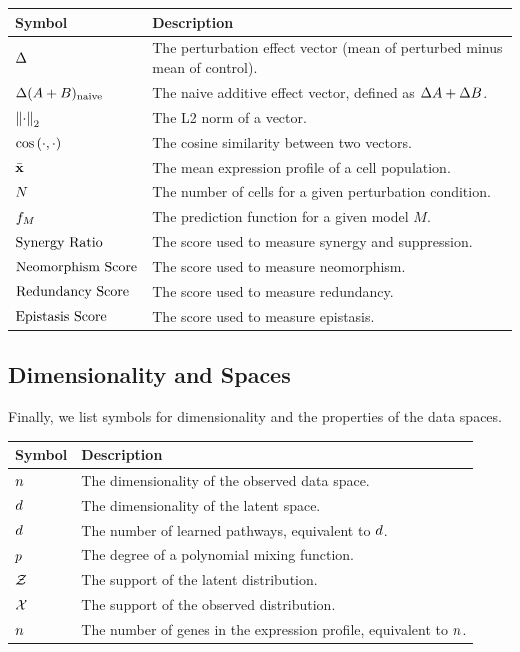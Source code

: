 \begin{table}[H]
\begin{tabularx}{\textwidth}{l X}
\toprule
\textbf{Symbol} & \textbf{Description} \\
\midrule
$\Delta$ & The perturbation effect vector (mean of perturbed minus mean of control). \\
$\Delta(A+B)_{\text{naive}}$ & The naive additive effect vector, defined as $\Delta A + \Delta B$. \\
$\left\lVert \cdot \right\rVert_2$ & The L2 norm of a vector. \\
$\cos\left(\cdot, \cdot\right)$ & The cosine similarity between two vectors. \\
$\bar{{\mathbf{x}}}$ & The mean expression profile of a cell population. \\
$N$ & The number of cells for a given perturbation condition. \\
$f_M$ & The prediction function for a given model $M$. \\
$\text{Synergy Ratio}$ & The score used to measure synergy and suppression. \\
$\text{Neomorphism Score}$ & The score used to measure neomorphism. \\
$\text{Redundancy Score}$ & The score used to measure redundancy. \\
$\text{Epistasis Score}$ & The score used to measure epistasis. \\
\bottomrule
\end{tabularx}
\end{table}

\subsection{Dimensionality and Spaces}
\label{app:nomenclature:dims}

Finally, we list symbols for dimensionality and the properties of the data spaces.

\begin{table}[H]
\begin{tabularx}{\textwidth}{l X}
\toprule
\textbf{Symbol} & \textbf{Description} \\
\midrule
$n$ & The dimensionality of the observed data space. \\
$d$ & The dimensionality of the latent space. \\
$d$ & The number of learned pathways, equivalent to $d$. \\
$p$ & The degree of a polynomial mixing function. \\
$\mathcal{Z}$ & The support of the latent distribution. \\
$\mathcal{X}$ & The support of the observed distribution. \\
$n$ & The number of genes in the expression profile, equivalent to $n$. \\
\bottomrule
\end{tabularx}
\end{table}

